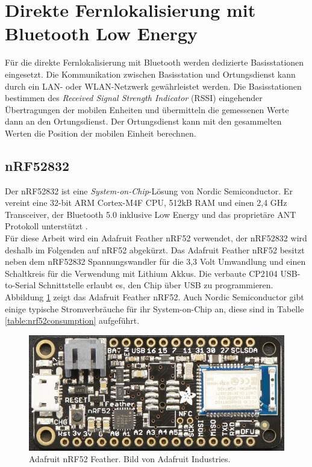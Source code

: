\section{Direkte Fernlokalisierung mit Bluetooth Low Energy}
\label{ch:phase3}
Für die direkte Fernlokalisierung mit Bluetooth werden dedizierte Basisstationen eingesetzt. 
Die Kommunikation zwischen Basisstation und Ortungsdienst kann durch ein LAN- oder WLAN-Netzwerk gewährleistet werden.
Die Basisstationen bestimmen des \emph{Received Signal Strength Indicator} (RSSI) eingehender Übertragungen der mobilen Enheiten und übermitteln die gemessenen Werte dann an den Ortungsdienst.
Der Ortungsdienst kann mit den gesammelten Werten die Position der mobilen Einheit berechnen.

\subsection{nRF52832}
Der nRF52832 ist eine \emph{System-on-Chip}-Lösung von Nordic Semiconductor.
Er vereint eine 32-bit ARM Cortex-M4F CPU, 512kB RAM und einen 2,4 GHz Transceiver, der Bluetooth 5.0 inklusive Low Energy und das proprietäre ANT Protokoll unterstützt \cite{nordic2017nrf}.\\
Für diese Arbeit wird ein Adafruit Feather nRF52 verwendet, der nRF52832 wird deshalb im Folgenden auf nRF52 abgekürzt.
Das Adafruit Feather nRF52 besitzt neben dem nRF52832 Spannungswandler für die 3,3 Volt Umwandlung und einen Schaltkreis für die Verwendung mit Lithium Akkus. 
Die verbaute CP2104 USB-to-Serial Schnittstelle erlaubt es, den Chip über USB zu programmieren.\\
Abbildung \ref{fig:nrf52layout} zeigt das Adafruit Feather nRF52.
Auch Nordic Semiconductor gibt einige typische Stromverbräuche für ihr System-on-Chip an, diese sind in Tabelle \ref{table:nrf52consumption} aufgeführt.

\begin{figure}[h]
  \centering
	\includegraphics[width=\textwidth]{images/nrf52ada.png}
  \caption{Adafruit nRF52 Feather. Bild von Adafruit Industries.}
  \label{fig:nrf52layout}
\end{figure}

